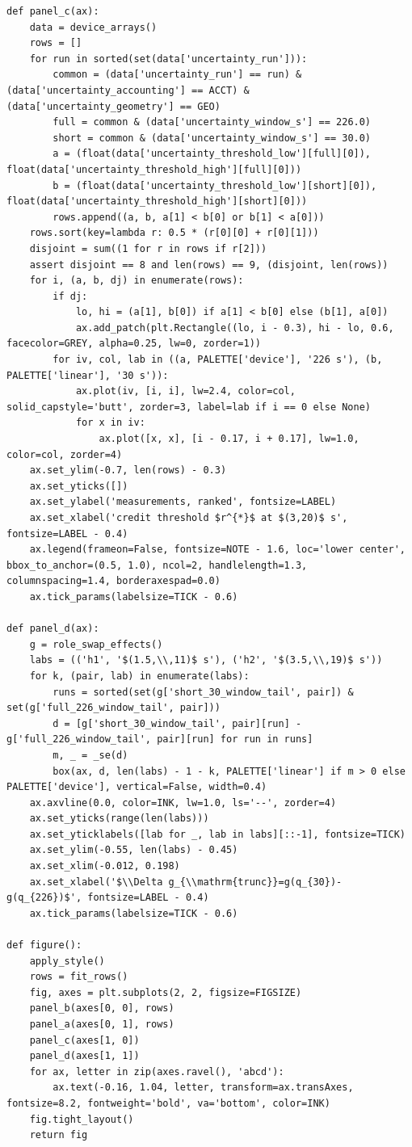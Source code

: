 \documentclass[a4paper,10pt]{article}
\begin{document}
\begin{Verbatim}
def panel_c(ax):
    data = device_arrays()
    rows = []
    for run in sorted(set(data['uncertainty_run'])):
        common = (data['uncertainty_run'] == run) & (data['uncertainty_accounting'] == ACCT) & (data['uncertainty_geometry'] == GEO)
        full = common & (data['uncertainty_window_s'] == 226.0)
        short = common & (data['uncertainty_window_s'] == 30.0)
        a = (float(data['uncertainty_threshold_low'][full][0]), float(data['uncertainty_threshold_high'][full][0]))
        b = (float(data['uncertainty_threshold_low'][short][0]), float(data['uncertainty_threshold_high'][short][0]))
        rows.append((a, b, a[1] < b[0] or b[1] < a[0]))
    rows.sort(key=lambda r: 0.5 * (r[0][0] + r[0][1]))
    disjoint = sum((1 for r in rows if r[2]))
    assert disjoint == 8 and len(rows) == 9, (disjoint, len(rows))
    for i, (a, b, dj) in enumerate(rows):
        if dj:
            lo, hi = (a[1], b[0]) if a[1] < b[0] else (b[1], a[0])
            ax.add_patch(plt.Rectangle((lo, i - 0.3), hi - lo, 0.6, facecolor=GREY, alpha=0.25, lw=0, zorder=1))
        for iv, col, lab in ((a, PALETTE['device'], '226 s'), (b, PALETTE['linear'], '30 s')):
            ax.plot(iv, [i, i], lw=2.4, color=col, solid_capstyle='butt', zorder=3, label=lab if i == 0 else None)
            for x in iv:
                ax.plot([x, x], [i - 0.17, i + 0.17], lw=1.0, color=col, zorder=4)
    ax.set_ylim(-0.7, len(rows) - 0.3)
    ax.set_yticks([])
    ax.set_ylabel('measurements, ranked', fontsize=LABEL)
    ax.set_xlabel('credit threshold $r^{*}$ at $(3,20)$ s', fontsize=LABEL - 0.4)
    ax.legend(frameon=False, fontsize=NOTE - 1.6, loc='lower center', bbox_to_anchor=(0.5, 1.0), ncol=2, handlelength=1.3, columnspacing=1.4, borderaxespad=0.0)
    ax.tick_params(labelsize=TICK - 0.6)

def panel_d(ax):
    g = role_swap_effects()
    labs = (('h1', '$(1.5,\\,11)$ s'), ('h2', '$(3.5,\\,19)$ s'))
    for k, (pair, lab) in enumerate(labs):
        runs = sorted(set(g['short_30_window_tail', pair]) & set(g['full_226_window_tail', pair]))
        d = [g['short_30_window_tail', pair][run] - g['full_226_window_tail', pair][run] for run in runs]
        m, _ = _se(d)
        box(ax, d, len(labs) - 1 - k, PALETTE['linear'] if m > 0 else PALETTE['device'], vertical=False, width=0.4)
    ax.axvline(0.0, color=INK, lw=1.0, ls='--', zorder=4)
    ax.set_yticks(range(len(labs)))
    ax.set_yticklabels([lab for _, lab in labs][::-1], fontsize=TICK)
    ax.set_ylim(-0.55, len(labs) - 0.45)
    ax.set_xlim(-0.012, 0.198)
    ax.set_xlabel('$\\Delta g_{\\mathrm{trunc}}=g(q_{30})-g(q_{226})$', fontsize=LABEL - 0.4)
    ax.tick_params(labelsize=TICK - 0.6)

def figure():
    apply_style()
    rows = fit_rows()
    fig, axes = plt.subplots(2, 2, figsize=FIGSIZE)
    panel_b(axes[0, 0], rows)
    panel_a(axes[0, 1], rows)
    panel_c(axes[1, 0])
    panel_d(axes[1, 1])
    for ax, letter in zip(axes.ravel(), 'abcd'):
        ax.text(-0.16, 1.04, letter, transform=ax.transAxes, fontsize=8.2, fontweight='bold', va='bottom', color=INK)
    fig.tight_layout()
    return fig
\end{Verbatim}
\end{document}
